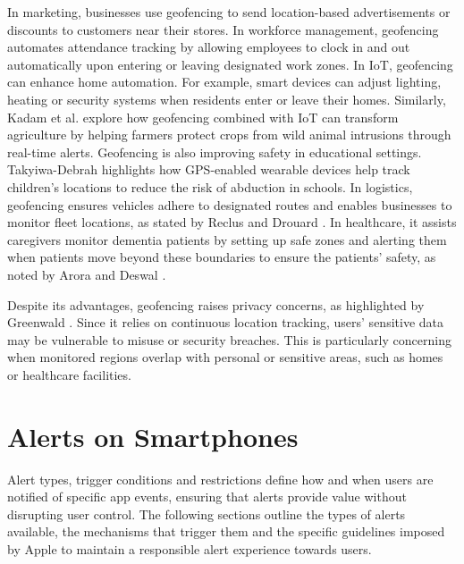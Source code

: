 In marketing, businesses use geofencing to send location-based advertisements or discounts to customers near their stores. 
In workforce management, geofencing automates attendance tracking by allowing employees to clock in and out automatically upon entering or leaving designated work zones.  
In \acs{IoT}, geofencing can enhance home automation. 
For example, smart devices can adjust lighting, heating or security systems when residents enter or leave their homes. 
Similarly, Kadam et al. \cite{kadam2020crops} explore how geofencing combined with \acs{IoT} can transform agriculture by helping farmers protect crops from wild animal intrusions through real-time alerts.  
Geofencing is also improving safety in educational settings. 
Takyiwa-Debrah \cite{takyiwa2023geofence} highlights how \acs{GPS}-enabled wearable devices help track children's locations to reduce the risk of abduction in schools. 
In logistics, geofencing ensures vehicles adhere to designated routes and enables businesses to monitor fleet locations, as stated by Reclus and Drouard \cite{reclus2009fleet}. 
In healthcare, it assists caregivers monitor dementia patients by setting up safe zones and alerting them when patients move beyond these boundaries to ensure the patients' safety, as noted by Arora and Deswal \cite{arora2023location}.

Despite its advantages, geofencing raises privacy concerns, as highlighted by Greenwald \cite{greenwald2011geofencing}. 
Since it relies on continuous location tracking, users' sensitive data may be vulnerable to misuse or security breaches. 
This is particularly concerning when monitored regions overlap with personal or sensitive areas, such as homes or healthcare facilities.

\section{Alerts on Smartphones}
Alert types, trigger conditions and restrictions define how and when users are notified of specific app events, ensuring that alerts provide value without disrupting user control. 
The following sections outline the types of alerts available, the mechanisms that trigger them and the specific guidelines imposed by Apple to maintain a responsible alert experience towards users.

